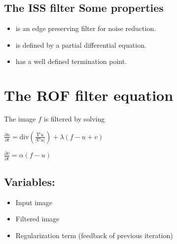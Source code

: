 \documentclass[letterpaper,10pt,english]{sphinxmanual}
\begin{document}
\subsection{The ISS filter \sphinxhyphen{} Some properties}
\label{\detokenize{02-ImageEnhancement:the-iss-filter-some-properties}}\begin{itemize}
\item {} 
\sphinxAtStartPar
is an edge preserving filter for noise reduction.

\item {} 
\sphinxAtStartPar
is defined by a partial differential equation.

\item {} 
\sphinxAtStartPar
has a well defined termination point.

\end{itemize}

\sphinxAtStartPar
{}


\section{The ROF filter equation}
\label{\detokenize{02-ImageEnhancement:the-rof-filter-equation}}
\sphinxAtStartPar
The image \(f\) is filtered by solving

\sphinxAtStartPar
\(\frac{\partial{}u}{\partial{}t}=\mathrm{div}\left(\frac{\nabla{}u}{|\nabla{}u|}\right)+\lambda{}(f-u+v)\)

\sphinxAtStartPar
\(\frac{\partial{}v}{\partial{}t}=\alpha{}(f-u)\)


\subsection{Variables:}
\label{\detokenize{02-ImageEnhancement:variables}}\begin{itemize}
\item {} 
\sphinxAtStartPar
{} Input image

\item {} 
\sphinxAtStartPar
{} Filtered image

\item {} 
\sphinxAtStartPar
{} Regularization term (feedback of previous iteration)

\end{itemize}
\end{document}

